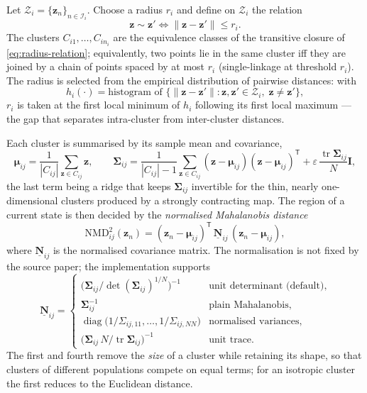 Let $\mathcal{Z}_i=\{\mathbf{z}_n\}_{n\in\mathcal{I}_i}$. Choose a radius $r_i$
and define on $\mathcal{Z}_i$ the relation
%
\begin{equation}
\mathbf{z}\sim\mathbf{z}' \iff \|\mathbf{z}-\mathbf{z}'\|\le r_i .
\label{eq:radius-relation}
\end{equation}
%
The clusters $C_{i1},\dots,C_{in_i}$ are the equivalence classes of the
transitive closure of \eqref{eq:radius-relation}; equivalently, two points lie
in the same cluster iff they are joined by a chain of points spaced by at most
$r_i$ (single-linkage at threshold $r_i$). The radius is selected from the
empirical distribution of pairwise distances: with
%
\begin{equation}
h_i(\cdot)=\text{histogram of }\bigl\{\|\mathbf{z}-\mathbf{z}'\|:\mathbf{z},\mathbf{z}'\in\mathcal{Z}_i,\;\mathbf{z}\neq\mathbf{z}'\bigr\},
\label{eq:distance-histogram}
\end{equation}
%
$r_i$ is taken at the first local minimum of $h_i$ following its first local
maximum --- the gap that separates intra-cluster from inter-cluster distances.

Each cluster is summarised by its sample mean and covariance,
%
\begin{equation}
\bm{\mu}_{ij}=\frac{1}{|C_{ij}|}\sum_{\mathbf{z}\in C_{ij}}\mathbf{z},
\qquad
\bm{\Sigma}_{ij}=\frac{1}{|C_{ij}|-1}\sum_{\mathbf{z}\in C_{ij}}
(\mathbf{z}-\bm{\mu}_{ij})(\mathbf{z}-\bm{\mu}_{ij})^{\mathsf T}
+\varepsilon\,\frac{\operatorname{tr}\bm{\Sigma}_{ij}}{N}\mathbf{I},
\label{eq:cluster-stats}
\end{equation}
%
the last term being a ridge that keeps $\bm{\Sigma}_{ij}$ invertible for the
thin, nearly one-dimensional clusters produced by a strongly contracting map.
The region of a current state is then decided by the \emph{normalised
Mahalanobis distance}
%
\begin{equation}
\mathrm{NMD}^{2}_{ij}(\mathbf{z}_n)=
(\mathbf{z}_n-\bm{\mu}_{ij})^{\mathsf T}\,\underline{\mathbf{N}}_{ij}\,(\mathbf{z}_n-\bm{\mu}_{ij}),
\label{eq:nmd}
\end{equation}
%
where $\underline{\mathbf{N}}_{ij}$ is the normalised covariance matrix. The
normalisation is not fixed by the source paper; the implementation supports
%
\begin{equation}
\underline{\mathbf{N}}_{ij}=
\begin{cases}
\bigl(\bm{\Sigma}_{ij}/\det(\bm{\Sigma}_{ij})^{1/N}\bigr)^{-1} & \text{unit determinant (default)},\\[2pt]
\bm{\Sigma}_{ij}^{-1} & \text{plain Mahalanobis},\\[2pt]
\operatorname{diag}\bigl(1/\Sigma_{ij,11},\dots,1/\Sigma_{ij,NN}\bigr) & \text{normalised variances},\\[2pt]
\bigl(\bm{\Sigma}_{ij}\,N/\operatorname{tr}\bm{\Sigma}_{ij}\bigr)^{-1} & \text{unit trace}.
\end{cases}
\label{eq:norm-variants}
\end{equation}
%
The first and fourth remove the \emph{size} of a cluster while retaining its
shape, so that clusters of different populations compete on equal terms; for an
isotropic cluster the first reduces to the Euclidean distance.

